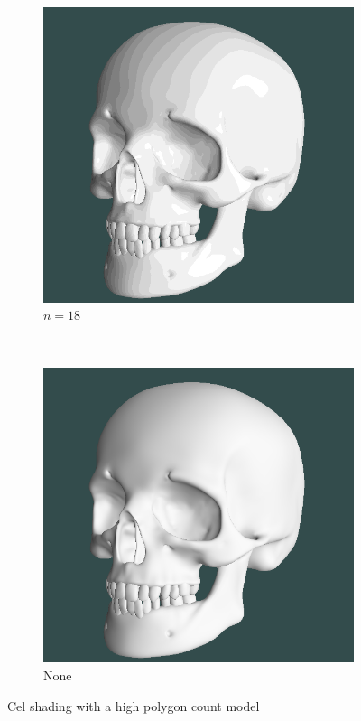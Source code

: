 \begin{figure}[h]
    \centering
    \begin{subfigure}[b]{0.15\textwidth}
        \includegraphics[width=\textwidth]{img/cel-shading-highpoly-n18.png}
        \caption{$n = 18$}
        \label{fig:cel-shading-high-poly-n18}
    \end{subfigure}
    ~
    \begin{subfigure}[b]{0.15\textwidth}
        \includegraphics[width=\textwidth]{img/cel-shading-highpoly-none.png}
        \caption{None}
        \label{fig:cel-shading-high-poly-none}
    \end{subfigure}
    \caption{Cel shading with a high polygon count model}
    \label{fig:cel-shading-high-poly}
\end{figure}

